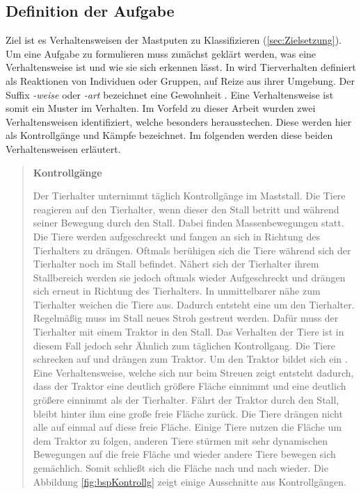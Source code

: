 \subsection{Definition der Aufgabe} \label{sec:Meth DefAufgabe}
Ziel ist es Verhaltensweisen der Mastputen zu Klassifizieren (\ref{sec:Zielsetzung}). Um eine Aufgabe zu formulieren muss zunächst geklärt werden, was eine Verhaltensweise ist und wie sie sich erkennen lässt. In \cite{Levitis.2009} wird Tierverhalten definiert als Reaktionen von Individuen oder Gruppen, auf Reize aus ihrer Umgebung. Der Suffix \textit{-weise} oder \textit{-art} bezeichnet eine Gewohnheit \cite{duden.art}. Eine Verhaltensweise ist somit ein Muster im Verhalten. Im Vorfeld zu dieser Arbeit wurden zwei Verhaltensweisen identifiziert, welche besonders herausstechen. Diese werden hier als Kontrollgänge und Kämpfe bezeichnet. Im folgenden werden diese beiden Verhaltensweisen erläutert. \dubpar

\begin{quote}

\textbf{Kontrollgänge}\par
Der Tierhalter unternimmt täglich Kontrollgänge im Maststall. Die Tiere reagieren auf den Tierhalter, wenn dieser den Stall betritt und während seiner Bewegung durch den Stall. Dabei finden Massenbewegungen statt. Die Tiere werden aufgeschreckt und fangen an sich in Richtung des Tierhalters zu drängen. Oftmals berühigen sich die Tiere während sich der Tierhalter noch im Stall befindet. Nähert sich der Tierhalter ihrem Stallbereich werden sie jedoch oftmals wieder Aufgeschreckt und drängen sich erneut in Richtung des Tierhalters. In unmittelbarer nähe zum Tierhalter weichen die Tiere aus. Dadurch entsteht eine  um den Tierhalter. Regelmäßig muss im Stall neues Stroh gestreut werden. Dafür muss der Tierhalter mit einem Traktor in den Stall. Das Verhalten der Tiere ist in diesem Fall jedoch sehr Ähnlich zum täglichen Kontrollgang. Die Tiere schrecken auf und drängen zum Traktor. Um den Traktor bildet sich ein . Eine Verhaltensweise, welche sich nur beim Streuen zeigt entsteht dadurch, dass der Traktor eine deutlich größere Fläche einnimmt und eine deutlich größere   einnimmt als der Tierhalter. Fährt der Traktor durch den Stall, bleibt hinter ihm eine große freie Fläche zurück. Die Tiere drängen nicht alle auf einmal auf diese freie Fläche. Einige Tiere nutzen die Fläche um dem Traktor zu folgen, anderen Tiere stürmen mit sehr dynamischen Bewegungen auf die freie Fläche und wieder andere Tiere bewegen sich gemächlich. Somit schließt sich die Fläche nach und nach wieder. Die Abbildung \ref{fig:bspKontrollg} zeigt einige Ausschnitte aus Kontrollgängen. 
\end{quote}

